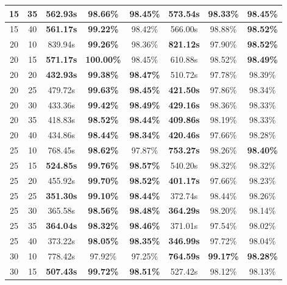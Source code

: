 \begin{table}[H]
\begin{tabular}{|c|c|c|c|c|c|c|c|}
\hline
15 & 35 & \textbf{562.93s} & \textbf{98.66\%} & 98.45\% & 573.54s & 98.33\% & 98.45\%  \\
\hline
15 & 40 & \textbf{561.17s} & \textbf{99.22\%} & 98.42\% & 566.00s & 98.88\% & \textbf{98.52\%}  \\
\hline
20 & 10 & 839.94s & \textbf{99.26\%} & 98.36\% & \textbf{821.12s} & 97.90\% & \textbf{98.52\%}  \\
\hline
20 & 15 & \textbf{571.17s} & \textbf{100.00\%} & 98.45\% & 610.88s & 98.52\% & \textbf{98.49\%}  \\
\hline
20 & 20 & \textbf{432.93s} & \textbf{99.38\%} & \textbf{98.47\%} & 510.72s & 97.78\% & 98.39\%  \\
\hline
20 & 25 & 479.72s & \textbf{99.63\%} & \textbf{98.45\%} & \textbf{421.50s} & 97.86\% & 98.34\%  \\
\hline
20 & 30 & 433.36s & \textbf{99.42\%} & \textbf{98.49\%} & \textbf{429.16s} & 98.36\% & 98.33\%  \\
\hline
20 & 35 & 418.83s & \textbf{98.52\%} & \textbf{98.44\%} & \textbf{409.86s} & 98.19\% & 98.33\%  \\
\hline
20 & 40 & 434.86s & \textbf{98.44\%} & \textbf{98.34\%} & \textbf{420.46s} & 97.66\% & 98.28\%  \\
\hline
25 & 10 & 768.45s & \textbf{98.62\%} & 97.87\% & \textbf{753.27s} & 98.26\% & \textbf{98.40\%}  \\
\hline
25 & 15 & \textbf{524.85s} & \textbf{99.76\%} & \textbf{98.57\%} & 540.20s & 98.32\% & 98.32\%  \\
\hline
25 & 20 & 455.92s & \textbf{99.70\%} & \textbf{98.52\%} & \textbf{401.17s} & 97.66\% & 98.23\%  \\
\hline
25 & 25 & \textbf{351.30s} & \textbf{99.10\%} & \textbf{98.44\%} & 372.74s & 98.44\% & 98.26\%  \\
\hline
25 & 30 & 365.58s & \textbf{98.56\%} & \textbf{98.48\%} & \textbf{364.29s} & 98.20\% & 98.14\%  \\
\hline
25 & 35 & \textbf{364.04s} & \textbf{98.32\%} & \textbf{98.46\%} & 371.01s & 97.54\% & 98.02\%  \\
\hline
25 & 40 & 373.22s & \textbf{98.05\%} & \textbf{98.35\%} & \textbf{346.99s} & 97.72\% & 98.04\%  \\
\hline
30 & 10 & 778.42s & 97.92\% & 97.25\% & \textbf{764.59s} & \textbf{99.17\%} & \textbf{98.28\%}  \\
\hline
30 & 15 & \textbf{507.43s} & \textbf{99.72\%} & \textbf{98.51\%} & 527.42s & 98.12\% & 98.13\%  \\

\end{tabular}
\end{table}
